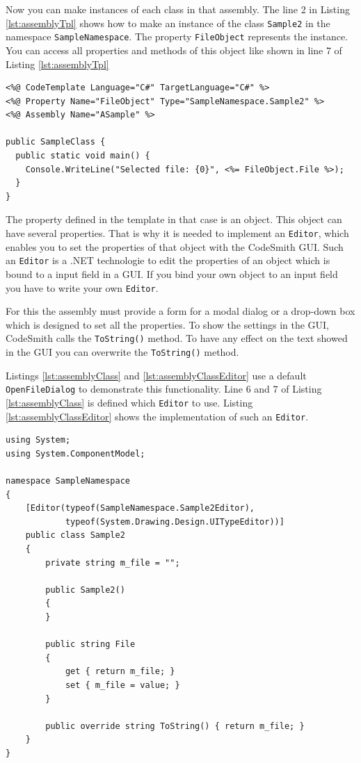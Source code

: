 Now you can make instances of each class in that assembly. The line 2 in Listing 
\ref{lst:assemblyTpl} shows how to make an instance of the class \verb~Sample2~ 
in the namespace \verb~SampleNamespace~. The property \verb~FileObject~ represents 
the instance. You can access all properties and methods of this object like shown 
in line 7 of Listing \ref{lst:assemblyTpl}

\begin{lstlisting}[float,caption=Use an Assembly,label=lst:assemblyTpl]
<%@ CodeTemplate Language="C#" TargetLanguage="C#" %>
<%@ Property Name="FileObject" Type="SampleNamespace.Sample2" %>
<%@ Assembly Name="ASample" %>

public SampleClass {
  public static void main() {
    Console.WriteLine("Selected file: {0}", <%= FileObject.File %>);
  }
}
\end{lstlisting}

The property defined in the template in that case is an object. This object can have 
several properties. That is why it is needed to implement an \verb~Editor~, which enables 
you to set the properties of that object with the CodeSmith GUI. Such an \verb~Editor~ is a 
.NET technologie to edit the properties of an object which is bound to a input field 
in a GUI. If you bind your own object to an input field you have to write your own 
\verb~Editor~.

For this the assembly must provide a form for a modal dialog or a drop-down box 
which is designed to set all the properties. To show the settings in the GUI, 
CodeSmith calls the \verb~ToString()~ method. To have any effect on the text showed 
in the GUI you can overwrite the \verb~ToString()~ method.

Listings \ref{lst:assemblyClass} and \ref{lst:assemblyClassEditor} use a 
default \verb~OpenFileDialog~ to demonstrate this functionality. Line 6 and 7 
of Listing \ref{lst:assemblyClass} is defined which \verb~Editor~ to use. Listing 
\ref{lst:assemblyClassEditor} shows the implementation of such an \verb~Editor~.

\begin{lstlisting}[caption=Assembly source,label=lst:assemblyClass]
using System;
using System.ComponentModel;

namespace SampleNamespace
{
	[Editor(typeof(SampleNamespace.Sample2Editor),
	        typeof(System.Drawing.Design.UITypeEditor))]
	public class Sample2 
	{
		private string m_file = "";

		public Sample2()
		{
		}

		public string File 
		{ 
			get { return m_file; } 
			set { m_file = value; } 
		}
	
		public override string ToString() {	return m_file; }
	}
}
\end{lstlisting}


